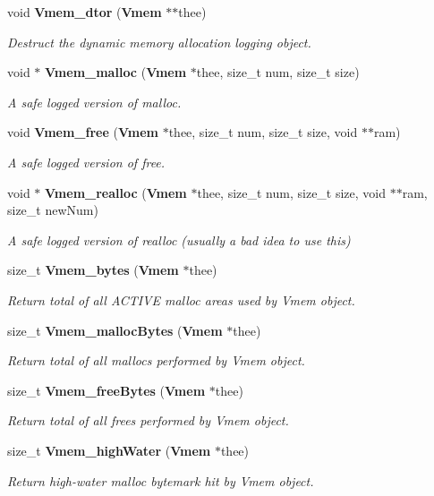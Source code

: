\begin{DoxyCompactItemize}
void {\bf Vmem\+\_\+dtor} ({\bf Vmem} $\ast$$\ast$thee)
\begin{DoxyCompactList}\small\item\em Destruct the dynamic memory allocation logging object. \end{DoxyCompactList}\item 
void $\ast$ {\bf Vmem\+\_\+malloc} ({\bf Vmem} $\ast$thee, size\+\_\+t num, size\+\_\+t size)
\begin{DoxyCompactList}\small\item\em A safe logged version of malloc. \end{DoxyCompactList}\item 
void {\bf Vmem\+\_\+free} ({\bf Vmem} $\ast$thee, size\+\_\+t num, size\+\_\+t size, void $\ast$$\ast$ram)
\begin{DoxyCompactList}\small\item\em A safe logged version of free. \end{DoxyCompactList}\item 
void $\ast$ {\bf Vmem\+\_\+realloc} ({\bf Vmem} $\ast$thee, size\+\_\+t num, size\+\_\+t size, void $\ast$$\ast$ram, size\+\_\+t new\+Num)
\begin{DoxyCompactList}\small\item\em A safe logged version of realloc (usually a bad idea to use this) \end{DoxyCompactList}\item 
size\+\_\+t {\bf Vmem\+\_\+bytes} ({\bf Vmem} $\ast$thee)
\begin{DoxyCompactList}\small\item\em Return total of all A\+C\+T\+I\+V\+E malloc areas used by Vmem object. \end{DoxyCompactList}\item 
size\+\_\+t {\bf Vmem\+\_\+malloc\+Bytes} ({\bf Vmem} $\ast$thee)
\begin{DoxyCompactList}\small\item\em Return total of all mallocs performed by Vmem object. \end{DoxyCompactList}\item 
size\+\_\+t {\bf Vmem\+\_\+free\+Bytes} ({\bf Vmem} $\ast$thee)
\begin{DoxyCompactList}\small\item\em Return total of all frees performed by Vmem object. \end{DoxyCompactList}\item 
size\+\_\+t {\bf Vmem\+\_\+high\+Water} ({\bf Vmem} $\ast$thee)
\begin{DoxyCompactList}\small\item\em Return high-\/water malloc bytemark hit by Vmem object. \end{DoxyCompactList}\item 
$$
\end{DoxyCompactItemize}
